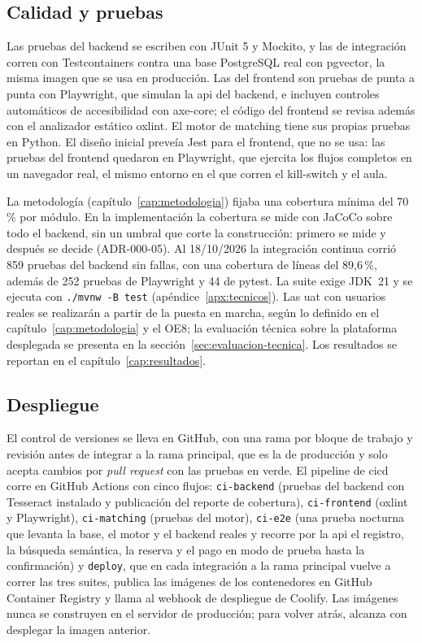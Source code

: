 \subsection{Calidad y pruebas}

Las pruebas del backend se escriben con JUnit 5 y Mockito, y las de
integración corren con Testcontainers contra una base PostgreSQL real con
pgvector, la misma imagen que se usa en producción. Las del frontend son
pruebas de punta a punta con Playwright, que simulan la \gls{api} del
backend, e incluyen controles automáticos de accesibilidad con axe-core;
el código del frontend se revisa además con el analizador estático
oxlint. El motor de \gls{matching} tiene sus propias pruebas en Python.
El diseño inicial preveía Jest para el frontend, que no se usa: las
pruebas del frontend quedaron en Playwright, que ejercita los flujos
completos en un navegador real, el mismo entorno en el que corren el
kill-switch y el aula.

La metodología (capítulo~\ref{cap:metodologia}) fijaba una cobertura
mínima del 70\,\% por módulo. En la implementación la cobertura se mide
con JaCoCo sobre todo el backend, sin un umbral que corte la
construcción: primero se mide y después se decide (ADR-000-05). Al
18/10/2026 la integración continua corrió 859 pruebas del backend sin fallas, con una
cobertura de líneas del 89,6\,\%, además de 252 pruebas de Playwright y 44 de pytest. La suite exige JDK~21 y se ejecuta con
\texttt{./mvnw -B test} (apéndice~\ref{apx:tecnicos}). Las \gls{uat} con
usuarios reales se realizarán a partir de la puesta en marcha, según lo
definido en el capítulo~\ref{cap:metodologia} y el OE8; la evaluación
técnica sobre la plataforma desplegada se presenta en la
sección~\ref{sec:evaluacion-tecnica}. Los resultados se reportan en el
capítulo~\ref{cap:resultados}.

\subsection{Despliegue}

El control de versiones se lleva en GitHub, con una rama por bloque de
trabajo y revisión antes de integrar a la rama principal, que es la de
producción y solo acepta cambios por \emph{pull request} con las pruebas en
verde. El pipeline de \gls{cicd} corre en GitHub Actions con cinco
flujos: \texttt{ci-backend} (pruebas del backend con Tesseract instalado y
publicación del reporte de cobertura), \texttt{ci-frontend} (oxlint y
Playwright), \texttt{ci-matching} (pruebas del motor), \texttt{ci-e2e}
(una prueba nocturna que levanta la base, el motor y el backend reales y
recorre por la \gls{api} el registro, la búsqueda semántica, la reserva y
el pago en modo de prueba hasta la confirmación) y \texttt{deploy}, que en cada integración
a la rama principal vuelve a correr las tres suites, publica las imágenes
de los contenedores en GitHub Container Registry y llama al webhook de
despliegue de Coolify. Las imágenes nunca se construyen en el servidor de
producción; para volver atrás, alcanza con desplegar la imagen anterior.

